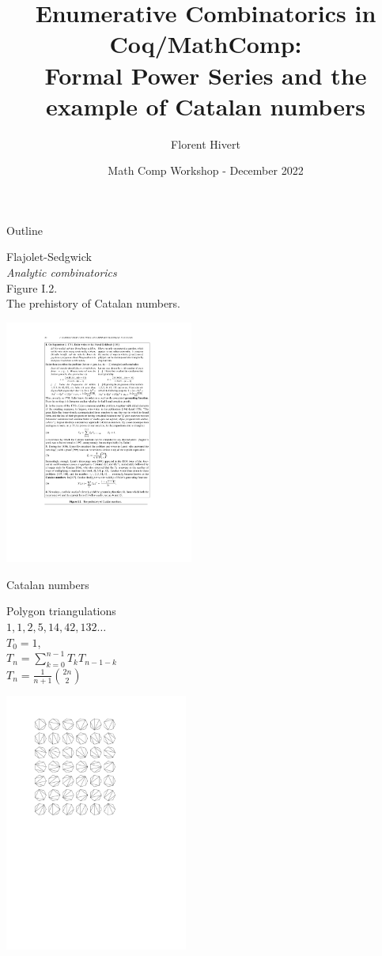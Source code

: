 \documentclass[compress,11pt]{beamer}
\title{\bf\LARGE Enumerative Combinatorics in Coq/MathComp: \\
  Formal Power Series and the example of Catalan numbers}
\author{Florent Hivert}
\institute[LISN]{
  LISN / Université Paris Saclay / CNRS}
\date[December 2022]{Math Comp Workshop - December 2022}
\begin{document}
\frame{\titlepage}

\begin{frame}{Outline}

  \tableofcontents
\end{frame}

\begin{frame}[fragile]
  \parbox{4cm}{Flajolet-Sedgwick\\
    \textit{Analytic combinatorics}\\
    Figure I.2. \\
    The prehistory of Catalan numbers.
  }\quad
  \includegraphics[align=c, trim=4.5cm 8.6cm 5cm 2.4cm, clip, width=6.2cm]{FlPage.pdf}
\end{frame}

\begin{frame}{Catalan numbers}

  \parbox{4cm}{
    \begin{center}
      Polygon triangulations\\[5mm]

      $1,1,2,5,14,42,132\dots$\\[3mm]
      $T_0=1$,\\[2mm]

      $\displaystyle T_n=\sum_{k=0}^{n-1}T_kT_{n-1-k}$\\[3mm]

      $\displaystyle T_n=\frac{1}{n+1}\binom{2n}{2}$
    \end{center}
  }\quad
  \includegraphics[align=c, trim=3cm 15cm 8cm 2.4cm, clip,
  width=6cm]{triangle.pdf}
\end{frame}
\end{document}
